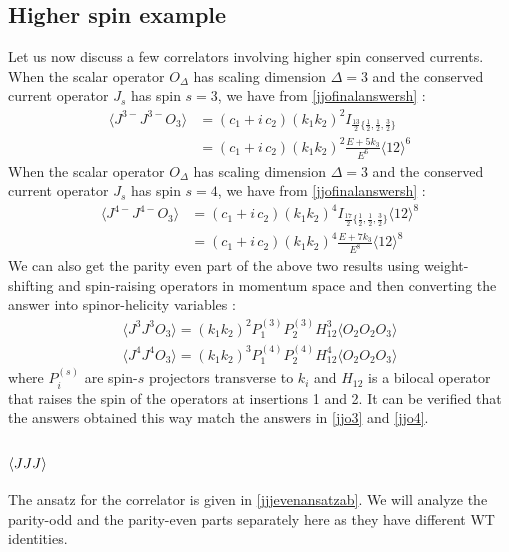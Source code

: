 \documentclass[a4paper,11pt]{article}
\begin{document}
\subsection*{Higher spin example}
Let us now discuss a few correlators involving higher spin conserved currents.
When the scalar operator $O_\Delta$ has scaling dimension $\Delta=3$ and the conserved current operator $J_s$ has spin $s=3$, we have from \eqref{jjofinalanswersh} :
\begin{align}
\label{jjo3}
\langle J^{3-} J^{3-} O_{3} \rangle& =(c_1+i\, c_2)  (k_1 k_2)^{2}I_{\frac{13}{2}\{\frac{1}{2},\frac{1}{2},\frac{3}{2}\}}\nonumber\\[5pt]
&=(c_1+i\, c_2)  (k_1 k_2)^2\frac{E+5k_3}{E^6}\langle 12\rangle^6
\end{align}
When the scalar operator $O_\Delta$ has scaling dimension $\Delta=3$ and the conserved current operator $J_s$ has spin $s=4$, we have from \eqref{jjofinalanswersh} :
\begin{align}
\label{jjo4}
\langle J^{4-} J^{4-} O_{3} \rangle &=(c_1+i\, c_2)  (k_1 k_2)^{4}I_{\frac{17}{2}\{\frac{1}{2},\frac{1}{2},\frac{3}{2}\}}\langle 12\rangle^8\nonumber\\[5pt]
&=(c_1+i\, c_2)(k_1 k_2)^4\frac{E+7k_3}{E^8}\langle 12\rangle^8
\end{align}
We can also get the parity even part of the above two results using weight-shifting and spin-raising operators in momentum space \cite{Baumann:2019oyu, Jain:2021wyn} and then converting the answer into spinor-helicity variables :
\begin{align}
\langle J^3 J^3 O_3 \rangle = (k_1 k_2)^2P^{(3)}_1 P^{(3)}_2 H_{12}^3 \langle O_2 O_2 O_3 \rangle\\[5 pt]
\langle J^4 J^4 O_3 \rangle = (k_1 k_2)^3P^{(4)}_1 P^{(4)}_2 H_{12}^4 \langle O_2 O_2 O_3 \rangle
\end{align}
where $P^{(s)}_{i}$ are spin-$s$ projectors transverse to $k_i$ and $H_{12}$ is a bilocal operator that raises the spin of the operators at insertions 1 and 2.
It can be verified that the answers obtained this way match the answers in \eqref{jjo3} and \eqref{jjo4}. 




\subsection{$\ev{JJJ}$}
\label{CWIjjj}
The ansatz for the correlator is given in \eqref{jjjevenansatzab}. We will analyze the parity-odd and the parity-even parts separately here as they have different WT identities. 
\end{document}
